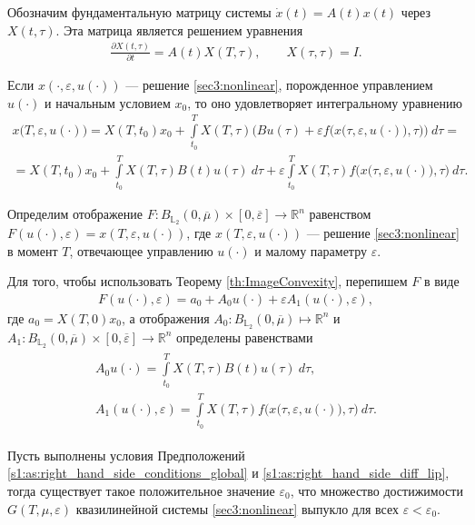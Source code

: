 \documentclass[../abstract.tex]{subfiles}
\begin{document}
Обозначим фундаментальную матрицу системы $\dot{x}(t) = A(t) x(t)$ через $X(t,\tau)$.
Эта матрица является решением уравнения
\begin{gather*}
	\frac{\partial X(t,\tau)}{\partial t} = A(t) X(T,\tau), \qquad X(\tau,\tau) = I.
\end{gather*}

Если $x(\cdot,\varepsilon, u(\cdot))$ --- решение \eqref{sec3:nonlinear}, порожденное управлением $u(\cdot)$ и начальным условием $x_0$, то оно удовлетворяет интегральному уравнению
\begin{gather*}
	x\big(T,\varepsilon, u(\cdot)\big) =
	X(T,t_0)x_0 + 
	\int\limits_{t_0}^T X(T,\tau) \bigg(Bu(\tau) +
	\varepsilon f\Big(x\big(\tau,\varepsilon, u(\cdot)\big),\tau\Big) \bigg)\ d\tau = \\ =
	X(T,t_0)x_0 +
	\int\limits_{t_0}^T X(T,\tau) B(t)u(\tau)\ d\tau 
	+ \varepsilon \int\limits_{t_0}^T X(T,\tau) f\Big(x\big(\tau,\varepsilon, u(\cdot)\big),\tau\Big) \ d\tau.
\end{gather*}

Определим отображение $F:B_{\mathbb{L}_2}(0,\overline{\mu})\times [0,\overline{\varepsilon}] \to \mathbb{R}^n$ равенством $F(u(\cdot),\varepsilon) = x(T,\varepsilon,u(\cdot))$, где $x(T,\varepsilon,u(\cdot))$ --- решение \eqref{sec3:nonlinear} в момент $T$, отвечающее управлению $u(\cdot)$ и малому параметру $\varepsilon$.

Для того, чтобы использовать Теорему \ref{th:ImageConvexity}, перепишем $F$ в виде
\begin{gather*}
	F(u(\cdot),\varepsilon) = a_0 + A_0 u(\cdot) + \varepsilon A_1(u(\cdot), \varepsilon), 
\end{gather*}
где $a_0 = X(T,0)x_0 $, а отображения $A_0: B_{\mathbb{L}_2}(0,\overline{\mu}) \mapsto \mathbb{R}^n$ и $A_1: B_{\mathbb{L}_2}(0,\overline{\mu}) \times [0,\overline{\varepsilon}] \to \mathbb{R}^n$ определены равенствами
\begin{gather}\label{A1_def}
	\begin{gathered}
	A_0 u(\cdot) = \int\limits_{t_0}^T X(T,\tau) B(t)u(\tau)\ d\tau, \\
	A_1(u(\cdot),\varepsilon) = \int\limits_{t_0}^T X(T,\tau) f\Big(x\big(\tau,\varepsilon, u(\cdot)\big),\tau\Big) \ d\tau.
	\end{gathered}
\end{gather}




\begin{theorem}\label{th:ReachableSetsConvexity}
	Пусть выполнены условия Предположений \ref{s1:as:right_hand_side_conditions_global} и \ref{s1:as:right_hand_side_diff_lip}, тогда существует такое положительное значение $\varepsilon_0$, что множество достижимости $G(T,\mu,\varepsilon) $ квазилинейной системы \eqref{sec3:nonlinear} выпукло для всех $\varepsilon < \varepsilon_0$. 
\end{theorem}
\end{document}
